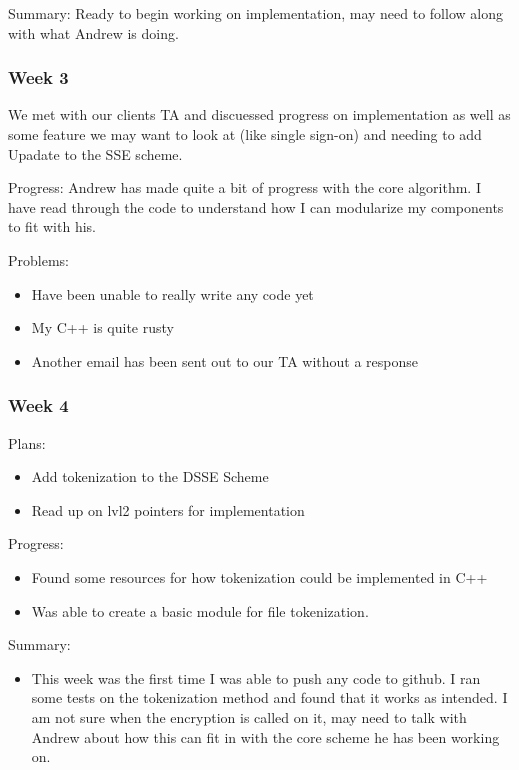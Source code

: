 \documentclass[onecolumn, draftclsnofoot,10pt, compsoc]{IEEEtran}
\begin{document}
Summary: Ready to begin working on implementation, may need to follow along with what Andrew is doing. 

\subsubsection{Week 3}

We met with our clients TA and discuessed progress on implementation as well as some feature we may want to look at (like single sign-on) and needing to add Upadate to the SSE scheme.

Progress: Andrew has made quite a bit of progress with the core algorithm. I have read through the code to understand how I can modularize my components to fit with his. 

\noindent Problems: 
\begin{itemize}
  \item Have been unable to really write any code yet
  \item My C++ is quite rusty 
  \item Another email has been sent out to our TA without a response
\end{itemize}
 

\subsubsection{Week 4} 

\noindent Plans: 
\begin{itemize}
  \item Add tokenization to the DSSE Scheme
  \item Read up on lvl2 pointers for implementation
\end{itemize} 

\noindent Progress: 
\begin{itemize}
  \item Found some resources for how tokenization could be implemented in C++
  \item Was able to create a basic module for file tokenization. 
 \end{itemize}

\noindent Summary: 
\begin{itemize}
  \item This week was the first time I was able to push any code to github. I ran some tests on the tokenization method and found that it works as intended. I am not sure when the encryption is called on it, may need to 
talk with Andrew about how this can fit in with the core scheme he has been working on. 
\end{itemize}
\end{document}
